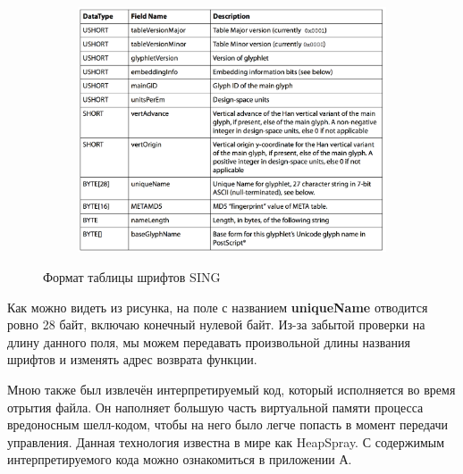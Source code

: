 \begin{figure}[ht]
	\centering
    \begin{subfigure}[b]{1\textwidth}
    \centering
        \includegraphics[scale=0.5]{1.pdf/pasted-image-15.png}
    \end{subfigure}
 
    \caption{Формат таблицы шрифтов SING}
    \label{fig_parsetree}
\end{figure}

Как можно видеть из рисунка, на поле с названием \textbf{uniqueName} отводится ровно 28 байт, включаю конечный нулевой байт.
Из-за забытой проверки на длину данного поля, мы можем передавать произвольной длины названия шрифтов и изменять адрес возврата функции.

Мною также был извлечён интерпретируемый код, который исполняется во время отрытия файла.
Он наполняет большую часть виртуальной памяти процесса вредоносным шелл-кодом, чтобы на него было легче попасть в момент передачи управления.
Данная технология известна в мире как HeapSpray. \cite{heap_spray}
С содержимым интерпретируемого кода можно ознакомиться в приложении А.

